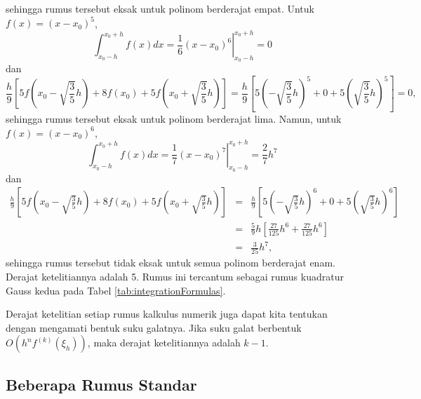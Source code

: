 sehingga rumus tersebut eksak untuk polinom berderajat empat. Untuk
$f(x)=(x-x_{0})^{5}$, 
\[
\int_{x_{0}-h}^{x_{0}+h}f(x)dx=\left.\frac{1}{6}(x-x_{0})^{6}\right|_{x_{0}-h}^{x_{0}+h}=0
\]
 dan
\[
\frac{h}{9}\left[5f\left(x_{0}-\sqrt{\frac{3}{5}}h\right)+8f(x_{0})+5f\left(x_{0}+\sqrt{\frac{3}{5}}h\right)\right]=\frac{h}{9}\left[5\left(-\sqrt{\frac{3}{5}}h\right)^{5}+0+5\left(\sqrt{\frac{3}{5}}h\right)^{5}\right]=0,
\]
sehingga rumus tersebut eksak untuk polinom berderajat lima. Namun,
untuk $f(x)=(x-x_{0})^{6}$, 
\[
\int_{x_{0}-h}^{x_{0}+h}f(x)dx=\left.\frac{1}{7}(x-x_{0})^{7}\right|_{x_{0}-h}^{x_{0}+h}=\frac{2}{7}h^{7}
\]
 dan
\begin{eqnarray*}
\frac{h}{9}\left[5f\left(x_{0}-\sqrt{\frac{3}{5}}h\right)+8f(x_{0})+5f\left(x_{0}+\sqrt{\frac{3}{5}}h\right)\right] & = & \frac{h}{9}\left[5\left(-\sqrt{\frac{3}{5}}h\right)^{6}+0+5\left(\sqrt{\frac{3}{5}}h\right)^{6}\right]\\
 & = & \frac{5}{9}h\left[\frac{27}{125}h^{6}+\frac{27}{125}h^{6}\right]\\
 & = & \frac{3}{25}h^{7},
\end{eqnarray*}
sehingga rumus tersebut tidak eksak untuk semua polinom berderajat
enam. Derajat ketelitiannya adalah 5. Rumus ini tercantum sebagai
rumus kuadratur Gauss kedua pada Tabel \ref{tab:integrationFormulas}. 

Derajat ketelitian setiap rumus kalkulus numerik juga dapat kita tentukan
dengan mengamati bentuk suku galatnya. Jika suku galat berbentuk $O(h^{n}f^{(k)}(\xi_{h}))$,
maka derajat ketelitiannya adalah $k-1$. 

\subsection{Beberapa Rumus Standar}

